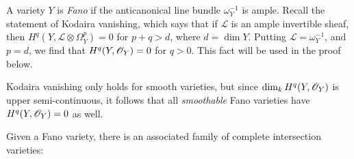 A variety $Y$ is \emph{Fano} if the anticanonical line bundle $\omega_Y^{-1}$ is ample. Recall the statement of Kodaira vanishing, which says that if $\mathscr L$ is an ample invertible sheaf, then $H^q(Y,\mathscr L \otimes \Omega_Y^p)=0$ for $p+q>d$, where $d=\dim Y$. Putting $\mathscr L=\omega_Y^{-1}$, and $p=d$, we find that $H^q(Y,\mathscr{O}_Y)=0$ for $q > 0$. This fact will be used in the proof below.

\begin{remark}
\label{remark:kodaira}
Kodaira vanishing only holds for smooth varieties, but since $\dim_k H^q(Y,\mathscr{O}_Y)$ is upper semi-continuous, it follows that all \emph{smoothable} Fano varieties have $H^q(Y,\mathscr{O}_Y)=0$ as well.
\end{remark}


Given a Fano variety, there is an associated family of complete intersection \CY varieties:

